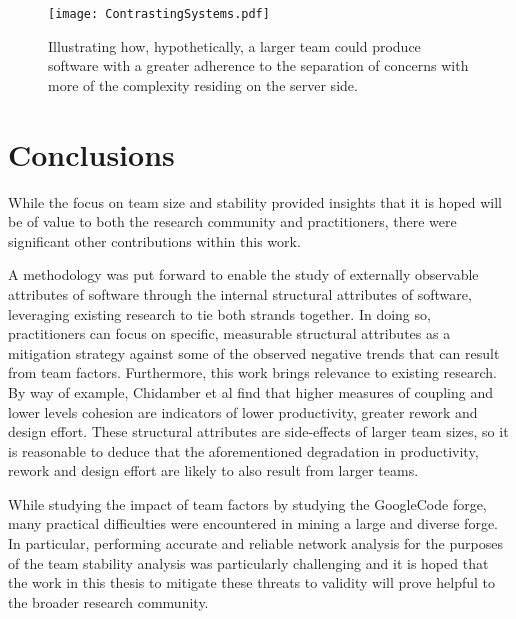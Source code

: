 \begin{itemize}
\end{itemize}

\begin{figure}[htbp!] 
\centering
\texttt{[image: ContrastingSystems.pdf]}
\caption{Illustrating how, hypothetically, a larger team could produce software with a greater adherence to the separation of concerns with more of the complexity residing on the server side.}
\label{fig:ContrastingSystems}
\end{figure}

\section{Conclusions} %
While the focus on team size and stability provided insights that it is hoped will be of value to both the research community and practitioners, there were significant other contributions within this work. 

A methodology was put forward to enable the study of externally observable attributes of software through the internal structural attributes of software, leveraging existing research to tie both strands together. In doing so, practitioners can focus on specific, measurable structural attributes as a mitigation strategy against some of the observed negative trends that can result from team factors. Furthermore, this work brings relevance to existing research. By way of example, Chidamber et al \citep{chidamber1998managerial} find that higher measures of coupling and lower levels cohesion are indicators of lower productivity, greater rework and design effort. These structural attributes are side-effects of larger team sizes, so it is reasonable to deduce that the aforementioned degradation in productivity, rework and design effort are likely to also result from larger teams.

While studying the impact of team factors by studying the GoogleCode forge, many practical difficulties were encountered in mining a large and diverse forge. In particular, performing accurate and reliable network analysis for the purposes of the team stability analysis was particularly challenging and it is hoped that the work in this thesis to mitigate these threats to validity will prove helpful to the broader research community. 

